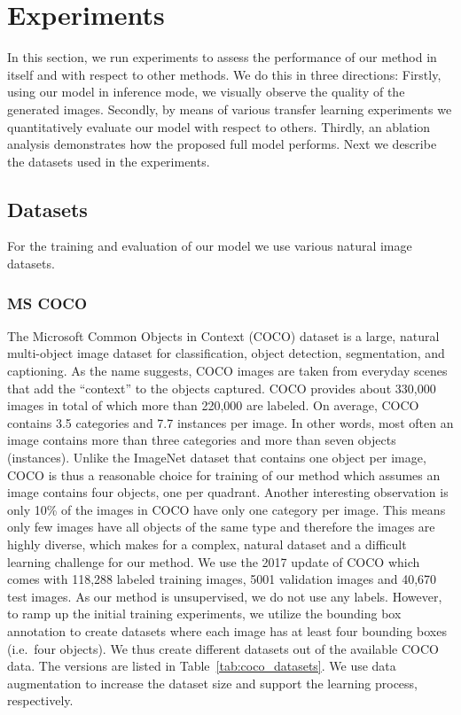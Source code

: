 \documentclass[a4paper,12pt]{report}
\begin{document}
\chapter{Experiments}\label{sec:experiments}
In this section, we run experiments to assess the performance of our method in itself and with respect to other methods. We do this in three directions: Firstly, using our model in inference mode, we visually observe the quality of the generated images. Secondly, by means of various transfer learning experiments we quantitatively evaluate our model with respect to others. Thirdly, an ablation analysis demonstrates how the proposed full model performs. Next we describe the datasets used in the experiments.

\section{Datasets}
For the training and evaluation of our model we use various natural image datasets.

\subsection{MS COCO}
The Microsoft Common Objects in Context (COCO) dataset \cite{MsCoco} is a large, natural multi-object image dataset for classification, object detection, segmentation, and captioning.
As the name suggests, COCO images are taken from everyday scenes that add the ``context'' to the objects captured. COCO provides about 330,000 images in total of which more than 220,000 are labeled. On average, COCO contains 3.5 categories and 7.7 instances per image. In other words, most often an image contains more than three categories and more than seven objects (instances). Unlike the ImageNet dataset that contains one object per image, COCO is thus a reasonable choice for training of our method which assumes an image contains four objects, one per quadrant. Another interesting observation is only 10\% of the images in COCO have only one category per image. This means only few images have all objects of the same type and therefore the images are highly diverse, which makes for a complex, natural dataset and a difficult learning challenge for our method. We use the 2017 update of COCO which comes with 118,288 labeled training images, 5001 validation images and 40,670 test images. As our method is unsupervised, we do not use any labels. However, to ramp up the initial training experiments, we utilize the bounding box annotation to create datasets where each image has at least four bounding boxes (i.e.\ four objects). We thus create different datasets out of the available COCO data. The versions are listed in Table~\ref{tab:coco_datasets}. We use data augmentation to increase the dataset size and support the learning process, respectively.
\end{document}
